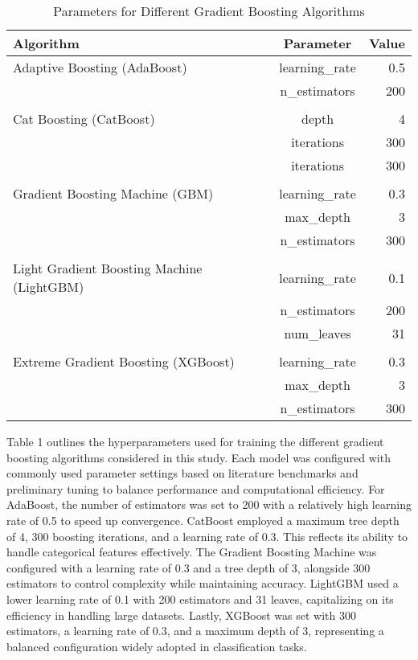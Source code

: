{\begin{table}[ht]
	\centering
	\caption{Parameters for Different Gradient Boosting Algorithms \cite{Salvador, 2024}}
	\label{tab:BoostingAlgortihms}
	\begin{tabular}{l c r}
		\toprule
		\textbf{Algorithm} & \textbf{Parameter} & \textbf{Value} \\
		\midrule
		Adaptive Boosting (AdaBoost) & learning\_rate & 0.5 \\
									 &n\_estimators & 200 \\
		\\Cat Boosting (CatBoost) & depth & 4 \\
								&iterations & 300 \\
								&iterations & 300 \\
		\\Gradient Boosting Machine (GBM) & learning\_rate & 0.3 \\
										&max\_depth & 3 \\
										&n\_estimators & 300 \\
		\\Light Gradient Boosting Machine (LightGBM) & learning\_rate & 0.1 \\
								&n\_estimators & 200 \\
								&num\_leaves & 31 \\
		\\Extreme Gradient Boosting (XGBoost) & learning\_rate & 0.3 \\
		&max\_depth & 3 \\
		&n\_estimators & 300 \\
		\bottomrule
	\end{tabular}
\end{table}

Table 1 outlines the hyperparameters used for training the different gradient boosting algorithms considered in this study. Each model was configured with commonly used parameter settings based on literature benchmarks and preliminary tuning to balance performance and computational efficiency. For AdaBoost, the number of estimators was set to 200 with a relatively high learning rate of 0.5 to speed up convergence. CatBoost employed a maximum tree depth of 4, 300 boosting iterations, and a learning rate of 0.3. This reflects its ability to handle categorical features effectively. The Gradient Boosting Machine was configured with a learning rate of 0.3 and a tree depth of 3, alongside 300 estimators to control complexity while maintaining accuracy. LightGBM used a lower learning rate of 0.1 with 200 estimators and 31 leaves, capitalizing on its efficiency in handling large datasets. Lastly, XGBoost was set with 300 estimators, a learning rate of 0.3, and a maximum depth of 3, representing a balanced configuration widely adopted in classification tasks. 

}
